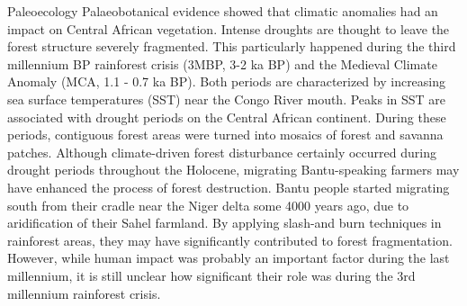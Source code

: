 \documentclass[a0]{sciposter}
\begin{document}
{\begin{minipage}[t][102cm][t]{82cm}
\begin{minipage}[t]{77cm}
\begin{multicols}{3}
\vfill\null
\columnbreak
{\fontsize{38}{42} \selectfont \textcolor{HeadCol}{Paleoecology}}
\bigbreak
{\fontsize{28}{36} \selectfont Palaeobotanical evidence showed that climatic anomalies had an impact on Central African vegetation. Intense droughts are thought to leave the forest structure severely fragmented. This particularly happened during the third millennium BP rainforest crisis (3MBP, 3-2 ka BP) and the Medieval Climate Anomaly (MCA, 1.1 - 0.7 ka BP). Both periods are characterized by increasing sea surface temperatures (SST) near the Congo River mouth. Peaks in SST are associated with drought periods on the Central African continent. During these periods, contiguous forest areas were turned into mosaics of forest and savanna patches.}
\bigbreak
{\fontsize{28}{36} \selectfont Although climate-driven forest disturbance certainly occurred during drought periods throughout the Holocene, migrating Bantu-speaking farmers may have enhanced the process of forest destruction. Bantu people started migrating south from their cradle near the Niger delta some 4000 years ago, due to aridification of their Sahel farmland. By applying slash-and burn techniques in rainforest areas, they may have significantly contributed to forest fragmentation. However, while human impact was probably an important factor during the last millennium, it is still unclear how significant their role was during the 3rd millennium rainforest crisis.}


\end{multicols}
\end{minipage}
\end{minipage}}
\end{document}
